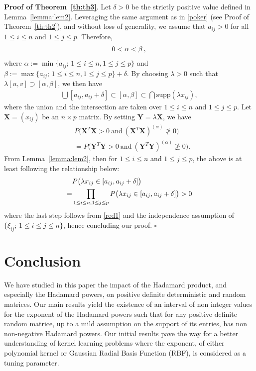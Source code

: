 \documentclass[conference,letterpaper]{IEEEtran}
\numberwithin{equation}{section}
\newcommand{\lbl}{\label}
\newcommand{\beaa}{\begin{eqnarray*}}
\newcommand{\eeaa}{\end{eqnarray*}}
\newcommand{\bea}{\begin{eqnarray}}
\newcommand{\eea}{\end{eqnarray}}
\begin{document}
\noindent\textbf{Proof of Theorem~\ref{th:th3}}. Let $\delta >0$ be the strictly positive value defined in Lemma~\ref{lemma:lem2}. 
Leveraging the same argument as in \eqref{poker} (see Proof of Theorem~\ref{th:th2}), and without loss of generality, we assume that $a_{ij}>0$ for all $1\leq i\leq n$ and $1\leq j \leq p$. 
Therefore,
\beaa
0 < \alpha < \beta \, , \notag \, 
\eeaa
where $\alpha:=\min\{a_{ij};\, 1\leq i \leq n, 1\leq j \leq p\}$ and $\beta:=\max\{a_{ij};\, 1\leq i\leq n, 1\leq j \leq p\}+\delta$.
By choosing $\lambda>0$ such that $\lambda [u, v]\supset [\alpha , \beta]$, we then have
\bea\lbl{red1}
\bigcup [a_{ij}, a_{ij}+\delta] \subset [\alpha, \beta]\subset \bigcap   \mbox{supp}(\lambda x_{ij}),
\eea
where the union and the intersection are taken over $1\leq i \leq n$ and $1\leq j \leq p.$ 
Let $\mathbf{X}=(x_{ij})$ be an $n\times p $ matrix.
By setting $\mathbf{Y}=\lambda\mathbf{X}$, we have
\beaa
& P\big(\mathbf{X}^T\mathbf{X}>0\ \mbox{and}\ (\mathbf{X}^T\mathbf{X})^{(\alpha)}\ngeqslant 0\big)\\
& =  P\big(\mathbf{Y}^T\mathbf{Y}>0\ \mbox{and}\ (\mathbf{Y}^T\mathbf{Y})^{(\alpha)}\ngeqslant 0\big).
\eeaa
From Lemma~\ref{lemma:lem2}, then for $1\leq i\leq n$ and $1\leq j \leq p$, the above is at least following the relationship below:
\begin{align}\notag
& P\big(\lambda x_{ij}\in [a_{ij}, a_{ij}+\delta]\big)\\ \notag
=& \prod_{1\leq i\leq n, 1\leq j \leq p}P\big(\lambda x_{ij}\in [a_{ij}, a_{ij}+\delta]\big)>0\notag
\end{align}
where the last step follows from \eqref{red1} and the independence assumption of $\{\xi_{ij};\, 1\leq i \leq j \leq n\}$, hence concluding our proof. \hfill$\square$



\section{Conclusion}\lbl{sec:conclusion}

We have studied in this paper the impact of the Hadamard product, and especially the Hadamard powers, on positive definite deterministic and random matrices.
Our main results yield the existence of an interval of non integer values for the exponent of the Hadamard powers such that for any positive definite random matrice, up to a mild assumption on the support of its entries, has non non-negative Hadamard powers.
Our initial results pave the way for a better understanding of kernel learning problems where the exponent, of either polynomial kernel or Gaussian Radial Basis Function (RBF), is considered as a tuning parameter.
\end{document}
